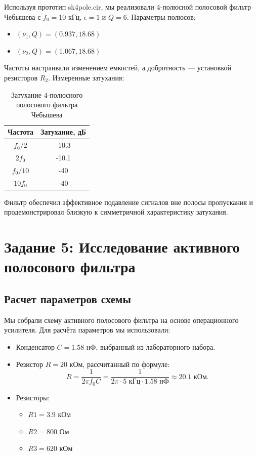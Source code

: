 Используя прототип sk4pole.cir, мы реализовали 4-полюсной полосовой фильтр Чебышева с $f_0 = 10$ кГц, $\epsilon = 1$ и $Q = 6$. Параметры полюсов:
\begin{itemize}
    \item $(\nu_1, Q) = (0.937, 18.68)$
    \item $(\nu_2, Q) = (1.067, 18.68)$
\end{itemize}

Частоты настраивали изменением емкостей, а добротность — установкой резисторов $R_2$. Измеренные затухания:

\begin{longtable}[c]{|c|c|}
\caption{Затухание 4-полюсного полосового фильтра Чебышева}
\label{tab:chebyshev_bandpass_attenuation}\\
\hline
Частота & Затухание, дБ \\ \hline
\endfirsthead
%
\endhead
%
$f_0/2$ & -10.3 \\ \hline
$2f_0$ & -10.1 \\ \hline
$f_0/10$ & -40 \\ \hline
$10f_0$ & -40 \\ \hline
\end{longtable}

Фильтр обеспечил эффективное подавление сигналов вне полосы пропускания и продемонстрировал близкую к симметричной характеристику затухания.

\newpage
\section{Задание 5: Исследование активного полосового фильтра}

\subsection{Расчет параметров схемы}

Мы собрали схему активного полосового фильтра на основе операционного усилителя. Для расчёта параметров мы использовали:
\begin{itemize}
    \item Конденсатор $C = 1.58 \text{ нФ}$, выбранный из лабораторного набора.
    \item Резистор $R = 20 \text{ кОм}$, рассчитанный по формуле:
    \[
    R = \frac{1}{2\pi f_0 C} = \frac{1}{2\pi \cdot 5 \text{ кГц} \cdot 1.58 \text{ нФ}} \approx 20.1 \text{ кОм}.
    \]
    \item Резисторы: 
        \begin{itemize}
            \item $R1 = 3.9 \text{ кОм}$
            \item $R2 = 800 \text{ Ом}$
            \item $R3 = 620 \text{ кОм}$
        \end{itemize}
\end{itemize}

